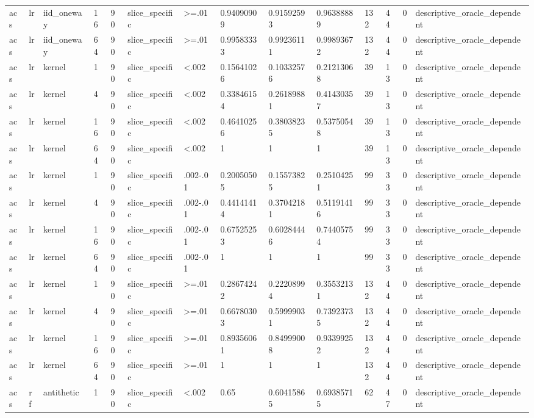 \begin{tabular}{llllllllllllll}
acs & lr & iid\_oneway & 16 & 90 & slice\_specific & >=.01 & 0.94090909 & 0.91592593 & 0.96388889 & 132 & 44 & 0 & descriptive\_oracle\_dependent \\
acs & lr & iid\_oneway & 64 & 90 & slice\_specific & >=.01 & 0.99583333 & 0.99236111 & 0.99893672 & 132 & 44 & 0 & descriptive\_oracle\_dependent \\
acs & lr & kernel & 1 & 90 & slice\_specific & <.002 & 0.15641026 & 0.10332576 & 0.21213068 & 39 & 13 & 0 & descriptive\_oracle\_dependent \\
acs & lr & kernel & 4 & 90 & slice\_specific & <.002 & 0.33846154 & 0.26189881 & 0.41430357 & 39 & 13 & 0 & descriptive\_oracle\_dependent \\
acs & lr & kernel & 16 & 90 & slice\_specific & <.002 & 0.46410256 & 0.38038235 & 0.53750548 & 39 & 13 & 0 & descriptive\_oracle\_dependent \\
acs & lr & kernel & 64 & 90 & slice\_specific & <.002 & 1 & 1 & 1 & 39 & 13 & 0 & descriptive\_oracle\_dependent \\
acs & lr & kernel & 1 & 90 & slice\_specific & .002-.01 & 0.20050505 & 0.15573825 & 0.25104251 & 99 & 33 & 0 & descriptive\_oracle\_dependent \\
acs & lr & kernel & 4 & 90 & slice\_specific & .002-.01 & 0.44141414 & 0.37042181 & 0.51191416 & 99 & 33 & 0 & descriptive\_oracle\_dependent \\
acs & lr & kernel & 16 & 90 & slice\_specific & .002-.01 & 0.67525253 & 0.60284446 & 0.74405754 & 99 & 33 & 0 & descriptive\_oracle\_dependent \\
acs & lr & kernel & 64 & 90 & slice\_specific & .002-.01 & 1 & 1 & 1 & 99 & 33 & 0 & descriptive\_oracle\_dependent \\
acs & lr & kernel & 1 & 90 & slice\_specific & >=.01 & 0.28674242 & 0.22208994 & 0.35532131 & 132 & 44 & 0 & descriptive\_oracle\_dependent \\
acs & lr & kernel & 4 & 90 & slice\_specific & >=.01 & 0.66780303 & 0.59999031 & 0.73923735 & 132 & 44 & 0 & descriptive\_oracle\_dependent \\
acs & lr & kernel & 16 & 90 & slice\_specific & >=.01 & 0.89356061 & 0.84999008 & 0.93399252 & 132 & 44 & 0 & descriptive\_oracle\_dependent \\
acs & lr & kernel & 64 & 90 & slice\_specific & >=.01 & 1 & 1 & 1 & 132 & 44 & 0 & descriptive\_oracle\_dependent \\
acs & rf & antithetic & 1 & 90 & slice\_specific & <.002 & 0.65 & 0.60415865 & 0.69385715 & 62 & 47 & 0 & descriptive\_oracle\_dependent \\

\end{tabular}
